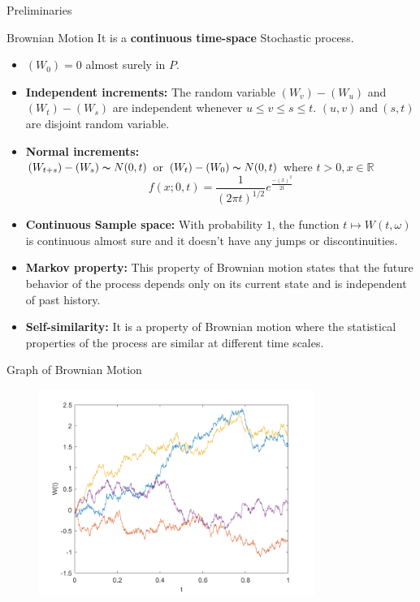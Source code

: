 \documentclass[final]{beamer}
\newlength{\colwidth}
\begin{document}
\begin{frame}[t]
\begin{columns}[t]
\begin{column}{\colwidth}
\begin{block}{Preliminaries}
  \end{block}

  \begin{alertblock}{Brownian Motion}
    It is a \textbf{continuous time-space} Stochastic process.
    \begin{itemize}
    \item $(W_0) = 0$ almost surely in $P$.
    \item \textbf{Independent increments:} 
    The random variable $(W_v)-(W_u)$ and $(W_t)-(W_s)$ are independent whenever $u\leq v \leq s \leq t$. $(u,v) \ \text{and} \  (s,t)$ are disjoint random variable.
    \item \textbf{Normal increments:}\\
    $(W_{t+s})-(W_s)  \thicksim N(0,t)$ or  $(W_{t})-(W_0)  \thicksim N(0,t)$  where $t > 0, x \in \mathbb{R}$ 
    \[ f(x;0,t) = \frac{1}{(2\pi t)^{1/2}} e^{\frac{-(x)^{2}}{2t}}\]
    \item \textbf{Continuous Sample space:}
    With probability $1$, the function $t \mapsto W(t,\omega)$ is continuous almost sure and it doesn't have any jumps or discontinuities.
    \item \textbf{Markov property:}
    This property of Brownian motion states that the future behavior of the process depends only on its current state and is independent of past history.
    \item \textbf{Self-similarity:}
    It is a property of Brownian motion where the statistical properties of the process are similar at different time scales.
\end{itemize}
  \end{alertblock}
  \begin{block}{Graph of Brownian Motion}
      \begin{figure}
      \centering
                    \includegraphics[width=0.8\textwidth]{figures/plot_bm.png}
    \end{figure}
  \end{block}
  


\end{column}
\end{columns}
\end{frame}
\end{document}
